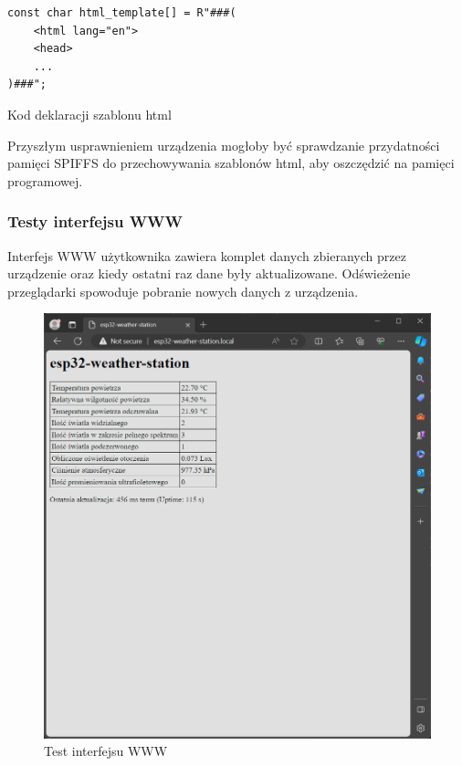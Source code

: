 \documentclass[12pt,a4paper]{article}
\begin{document}
\begin{code}[H]
\begin{verbatim}
const char html_template[] = R"###(
    <html lang="en">
    <head>
    ...
)###";
\end{verbatim}
\caption{Kod deklaracji szablonu html}
\label{html-template-code}
\end{code}

Przyszłym usprawnieniem urządzenia mogłoby być sprawdzanie przydatności pamięci SPIFFS do przechowywania szablonów html, aby oszczędzić na pamięci programowej.

\subsubsection{Testy interfejsu WWW}

Interfejs WWW użytkownika zawiera komplet danych zbieranych przez urządzenie oraz kiedy ostatni raz dane były aktualizowane. 
Odświeżenie przeglądarki spowoduje pobranie nowych danych z urządzenia.
\begin{figure}[H]
    \centering
    \includegraphics[width=\textwidth]{web-interface.png}
    \caption{Test interfejsu WWW}
\end{figure}
\end{document}
